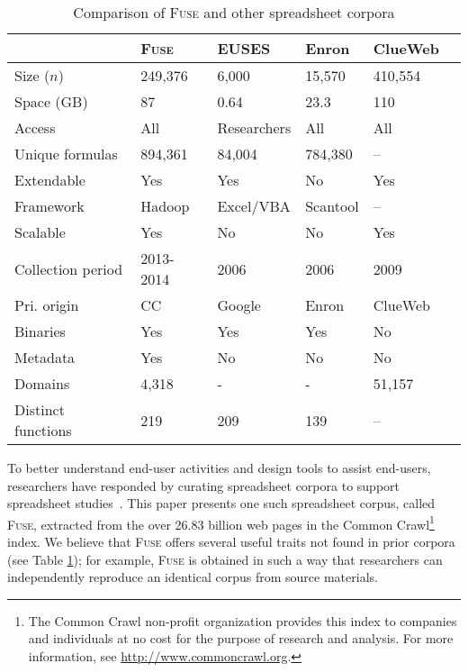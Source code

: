 \documentclass[conference]{IEEEtran}
\begin{document}

\begin{table}[!t]
\caption{Comparison of \textsc{Fuse} and other spreadsheet corpora\label{tab:corpora}}
\centering
\begin{tabular}{llllll}
\toprule
 & \textbf{\textsc{Fuse}} & \textbf{EUSES} & \textbf{Enron} & \textbf{ClueWeb}\\
\midrule
Size ($n$) & 249,376 & 6,000 & 15,570 & 410,554\\
Space (GB) & 87  & 0.64 & 23.3 & 110\\
Access & All & Researchers & All & All\\
Unique formulas & 894,361 & 84,004 & 784,380  & --\\
Extendable & Yes & Yes & No & Yes\\
Framework & Hadoop & Excel/VBA & Scantool & \textsc{--}\\
Scalable & Yes & No & No & Yes\\
Collection period & 2013-2014 & 2006 & 2006 & 2009\\
Pri. origin & CC & Google & Enron & ClueWeb\\
Binaries & Yes  & Yes & Yes & No\\
Metadata & Yes & No & No & No\\
Domains & 4,318 & - & - & 51,157\\
Distinct functions & 219 & 209 & 139 & --\\
\bottomrule
\end{tabular}
\end{table}


To better understand end-user activities and design tools to assist end-users, researchers have responded by curating spreadsheet corpora to support spreadsheet studies~\cite{Fisher2005,Hermans2015,Chen2013}. 
%
This paper presents one such spreadsheet corpus, called \textsc{Fuse}, extracted from the over 26.83 billion web pages in the Common Crawl\footnote{The Common Crawl non-profit organization provides this index to companies and individuals at no cost for the purpose of research and analysis. For more information, see \url{http://www.commoncrawl.org}.} index. 
%
We believe that \textsc{Fuse} offers several useful traits not found in prior corpora (see Table \ref{tab:corpora}); 
for example, \textsc{Fuse} is obtained in such a way that researchers can independently reproduce an identical corpus from source materials.
\end{document}
